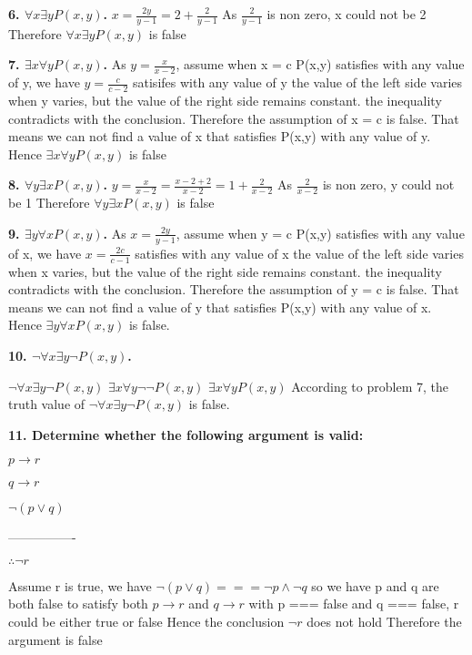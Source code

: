 \documentclass{article}
\begin{document}
\textbf{6. $\forall x \exists yP(x,y)$.}
$x = \frac{2y}{y-1} = 2 + \frac{2}{y-1}$
As $\frac{2}{y-1}$ is non zero, x could not be 2
Therefore $\forall x \exists yP(x,y)$ is false

\textbf{7. $\exists x \forall yP(x,y)$.}
As $y = \frac{x}{x-2}$, 
assume when x = c P(x,y) satisfies with any value of y, 
we have $y = \frac{c}{c-2}$ satisifes with any value of y
the value of the left side varies when y varies, 
but the value of the right side remains constant.
the inequality contradicts with the conclusion.
Therefore the assumption of x = c is false.
That means we can not find a value of x that satisfies P(x,y) with any value of y.
Hence $\exists x \forall yP(x,y)$ is false

\textbf{8. $\forall y \exists xP(x,y)$.}
$y = \frac{x}{x-2} = \frac{x-2+2}{x-2} = 1 + \frac{2}{x-2}$ 
As $\frac{2}{x-2}$ is non zero, y could not be 1
Therefore $\forall y \exists xP(x,y)$ is false

\textbf{9. $\exists y \forall xP(x,y)$.}
As $x = \frac{2y}{y-1}$, 
assume when y = c P(x,y) satisfies with any value of x,
we have $x = \frac{2c}{c-1}$ satisfies with any value of x
the value of the left side varies when x varies,
but the value of the right side remains constant.
the inequality contradicts with the conclusion.
Therefore the assumption of y = c is false.
That means we can not find a value of y that satisfies P(x,y) with any value of x.
Hence $\exists y \forall xP(x,y)$ is false.

\textbf{10. $\lnot \forall x \exists y \lnot P(x,y)$.}

$\lnot \forall x \exists y \lnot P(x,y)$
$\exists x \forall y \lnot \lnot P(x,y)$
$\exists x \forall y P(x,y)$
According to problem 7, the truth value of $\lnot \forall x \exists y \lnot P(x,y)$ is false.

\textbf{11. Determine whether the following argument is valid:}

\textbf{$p \to r$}

\textbf{$q \to r$}

\textbf{$\lnot (p \lor q)$}

----------------

$\therefore \lnot r$

Assume r is true, 
we have $\lnot (p \lor q) === \lnot p \land \lnot q$ so we have p and q are both false
to satisfy both {$p \to r$} and {$q \to r$} with p === false and q === false,
r could be either true or false
Hence the conclusion $\lnot r$ does not hold
Therefore the argument is false
\end{document}

